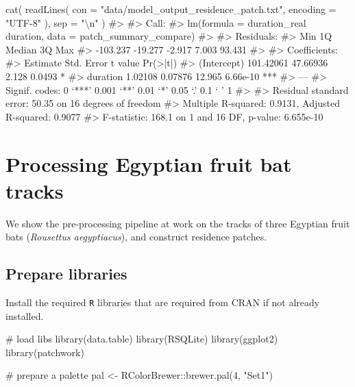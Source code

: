 \documentclass[]{scrreprt}
\newenvironment{Shaded}{}{}
\newcommand{\CharTok}[1]{\textcolor[rgb]{0.00,0.50,0.50}{#1}}
\newcommand{\CommentTok}[1]{\textcolor[rgb]{0.00,0.50,0.00}{#1}}
\newcommand{\DataTypeTok}[1]{#1}
\newcommand{\DecValTok}[1]{#1}
\newcommand{\KeywordTok}[1]{\textcolor[rgb]{0.00,0.00,1.00}{#1}}
\newcommand{\NormalTok}[1]{#1}
\newcommand{\OperatorTok}[1]{#1}
\newcommand{\StringTok}[1]{\textcolor[rgb]{0.00,0.50,0.50}{#1}}
\begin{document}
\begin{Shaded}
\begin{Highlighting}[]
\KeywordTok{cat}\NormalTok{(}
  \KeywordTok{readLines}\NormalTok{(}
    \DataTypeTok{con =} \StringTok{"data/model_output_residence_patch.txt"}\NormalTok{,}
    \DataTypeTok{encoding =} \StringTok{"UTF-8"}
\NormalTok{  ), }\DataTypeTok{sep =} \StringTok{"}\CharTok{\textbackslash{}n}\StringTok{"}
\NormalTok{)}
\CommentTok{#> }
\CommentTok{#> Call:}
\CommentTok{#> lm(formula = duration_real ~ duration, data = patch_summary_compare)}
\CommentTok{#> }
\CommentTok{#> Residuals:}
\CommentTok{#>      Min       1Q   Median       3Q      Max }
\CommentTok{#> -103.237  -19.277   -2.917    7.003   93.431 }
\CommentTok{#> }
\CommentTok{#> Coefficients:}
\CommentTok{#>              Estimate Std. Error t value Pr(>|t|)    }
\CommentTok{#> (Intercept) 101.42061   47.66936   2.128   0.0493 *  }
\CommentTok{#> duration      1.02108    0.07876  12.965 6.66e-10 ***}
\CommentTok{#> ---}
\CommentTok{#> Signif. codes:  0 ‘***’ 0.001 ‘**’ 0.01 ‘*’ 0.05 ‘.’ 0.1 ‘ ’ 1}
\CommentTok{#> }
\CommentTok{#> Residual standard error: 50.35 on 16 degrees of freedom}
\CommentTok{#> Multiple R-squared:  0.9131, Adjusted R-squared:  0.9077 }
\CommentTok{#> F-statistic: 168.1 on 1 and 16 DF,  p-value: 6.655e-10}
\end{Highlighting}
\end{Shaded}

\hypertarget{processing-egyptian-fruit-bat-tracks}{%
\chapter{Processing Egyptian fruit bat tracks}\label{processing-egyptian-fruit-bat-tracks}}

We show the pre-processing pipeline at work on the tracks of three Egyptian fruit bats (\emph{Rousettus aegyptiacus}), and construct residence patches.

\hypertarget{prepare-libraries-1}{%
\section{Prepare libraries}\label{prepare-libraries-1}}

Install the required \texttt{R} libraries that are required from CRAN if not already installed.

\begin{Shaded}
\begin{Highlighting}[]
\CommentTok{# load libs}
\KeywordTok{library}\NormalTok{(data.table)}
\KeywordTok{library}\NormalTok{(RSQLite)}
\KeywordTok{library}\NormalTok{(ggplot2)}
\KeywordTok{library}\NormalTok{(patchwork)}

\CommentTok{# prepare a palette}
\NormalTok{pal <-}\StringTok{ }\NormalTok{RColorBrewer}\OperatorTok{::}\KeywordTok{brewer.pal}\NormalTok{(}\DecValTok{4}\NormalTok{, }\StringTok{"Set1"}\NormalTok{)}
\end{Highlighting}
\end{Shaded}
\end{document}
